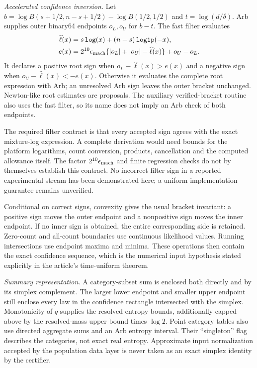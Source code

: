 \emph{Accelerated confidence inversion.} Let $b=\log B(s+1/2,n-s+1/2)-\log B(1/2,1/2)$ and $t=\log(d/\delta)$. Arb supplies outer binary64 endpoints $o_L,o_U$ for $b-t$. The fast filter evaluates
\begin{align}
 \widehat\ell(x)&=s\,\texttt{log}(x)+(n-s)\,\texttt{log1p}(-x),\\
 e(x)&=2^{10}\epsilon_{\rm mach}
       \{|o_L|+|o_U|-\widehat\ell(x)\}+o_U-o_L.
\end{align}
It declares a positive root sign when $o_L-\widehat\ell(x)>e(x)$ and a negative sign when $o_U-\widehat\ell(x)<-e(x)$. Otherwise it evaluates the complete root expression with Arb; an unresolved Arb sign leaves the outer bracket unchanged. Newton-like root estimates are proposals. The auxiliary verified-bracket routine also uses the fast filter, so its name does not imply an Arb check of both endpoints.

The required filter contract is that every accepted sign agrees with the exact mixture-log expression. A complete derivation would need bounds for the platform logarithms, count conversion, products, cancellation and the computed allowance itself. The factor $2^{10}\epsilon_{\rm mach}$ and finite regression checks do not by themselves establish this contract. No incorrect filter sign in a reported experimental stream has been demonstrated here; a uniform implementation guarantee remains unverified.

Conditional on correct signs, convexity gives the usual bracket invariant: a positive sign moves the outer endpoint and a nonpositive sign moves the inner endpoint. If no inner sign is obtained, the entire corresponding side is retained. Zero-count and all-count boundaries use continuous likelihood values. Running intersections use endpoint maxima and minima. These operations then contain the exact confidence sequence, which is the numerical input hypothesis stated explicitly in the article's time-uniform theorem.

\emph{Summary representation.} A category-subset sum is enclosed both directly and by its simplex complement. The larger lower endpoint and smaller upper endpoint still enclose every law in the confidence rectangle intersected with the simplex. Monotonicity of $q$ supplies the resolved-entropy bounds, additionally capped above by the resolved-mass upper bound times $\log2$. Point category tables also use directed aggregate sums and an Arb entropy interval. Their ``singleton'' flag describes the categories, not exact real entropy. Approximate input normalization accepted by the population data layer is never taken as an exact simplex identity by the certifier.

